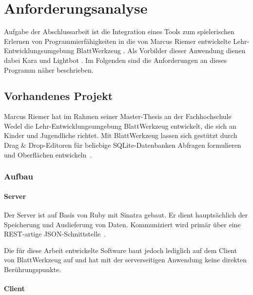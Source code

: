 \chapter{Anforderungsanalyse}
\label{sec:requirements}

Aufgabe der Abschlussarbeit ist die Integration eines Tools zum spielerischen Erlernen von Programmierfähigkeiten in die von Marcus Riemer entwickelte Lehr-Entwicklungsumgebung BlattWerkzeug . Als Vorbilder dieser Anwendung dienen dabei Kara  und Lightbot . Im Folgenden sind die Anforderungen an dieses Programm näher beschrieben.

\section{Vorhandenes Projekt}
\label{sec:requirements:existing}

Marcus Riemer hat im Rahmen seiner Master-Thesis an der Fachhochschule Wedel die Lehr-Entwicklungsumgebung BlattWerkzeug entwickelt, die sich an Kinder und Jugendliche richtet. Mit BlattWerkzeug lassen sich gestützt durch Drag \& Drop-Editoren für beliebige SQLite-Datenbanken Abfragen formulieren und Oberflächen entwickeln~\cite[2]{riemer2016}.

\subsection{Aufbau}

\subsubsection{Server}

Der Server ist auf Basis von Ruby mit Sinatra gebaut. Er dient hauptsächlich der Speicherung und Auslieferung von Daten. Kommuniziert wird primär über eine REST-artige JSON-Schnittstelle~\cite[94]{riemer2016}.

Die für diese Arbeit entwickelte Software baut jedoch lediglich auf dem Client von BlattWerkzeug auf und hat mit der serverseitigen Anwendung keine direkten Berührungspunkte.

\subsubsection{Client}

